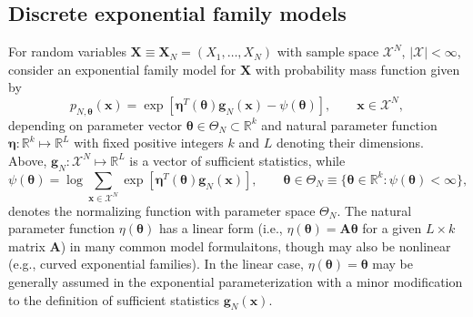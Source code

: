 \documentclass[12pt]{article}
\theoremstyle{definition}
\begin{document}
\subsection{Discrete exponential family
models}\label{discrete-exponential-family-models}

For random variables
\(\boldsymbol X \equiv\boldsymbol X_N= (X_1, \dots, X_N)\) with sample
space \(\mathcal{X}^N\), \(|\mathcal{X}| < \infty\), consider an
exponential family model for \(\boldsymbol X\) with probability mass
function given by
\begin{equation}
\label{eq:expo}
p_{N, \boldsymbol \theta}(\boldsymbol x) = \exp\left[\boldsymbol\eta^T(\boldsymbol \theta) \boldsymbol g_N(\boldsymbol x) - \psi(\boldsymbol \theta)\right], \qquad \boldsymbol x \in \mathcal{X}^N,
\end{equation}
depending on parameter vector
\(\boldsymbol \theta \in \Theta_N \subset \mathbb{R}^{k}\) and natural
parameter function
\(\boldsymbol \eta : \mathbb{R}^k \mapsto \mathbb{R}^L\) with fixed
positive integers \(k\) and \(L\) denoting their dimensions. Above,
\(\boldsymbol g_N : \mathcal{X}^N \mapsto \mathbb{R}^L\) is a vector of
sufficient statistics, while \[
\psi(\boldsymbol \theta) = \log \sum\limits_{\boldsymbol x \in \mathcal{X}^N}\exp\left[\boldsymbol \eta^T(\boldsymbol \theta) \boldsymbol g_N(\boldsymbol x) \right], \qquad \boldsymbol \theta \in \Theta_N\equiv \{\boldsymbol \theta \in \mathbb{R}^k : \psi(\boldsymbol \theta) < \infty \},
\] denotes the normalizing function with parameter space \(\Theta_N\).
The natural parameter function \(\eta (\boldsymbol \theta)\) has a
linear form (i.e.,
\(\eta (\boldsymbol \theta)= \bm{A} \boldsymbol \theta\) for a given
\(L \times k\) matrix \(\bm{A}\)) in many common model formulaitons,
though may also be nonlinear (e.g., curved exponential families). In the
linear case, \(\eta (\boldsymbol \theta) = \boldsymbol \theta\) may be
generally assumed in the exponential parameterization with a minor
modification to the definition of sufficient statistics
\(\boldsymbol g_N(\boldsymbol x)\).
\end{document}
